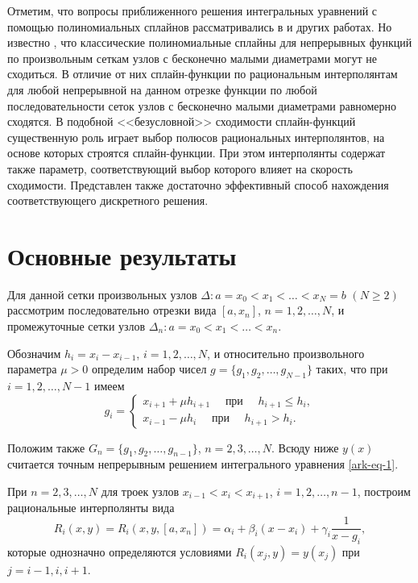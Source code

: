 Отметим, что вопросы приближенного решения интегральных уравнений с помощью полиномиальных
сплайнов рассматривались в \cite{ark-4,ark-5,ark-6,ark-7} и других работах. Но известно
\cite{ark-7, ark-8}, что классические полиномиальные сплайны для непрерывных функций
по произвольным сеткам узлов с бесконечно малыми диаметрами могут не сходиться.
В отличие от них сплайн-функции по рациональным интерполянтам \cite{ark-9} для любой непрерывной
на данном отрезке функции по любой последовательности сеток узлов с бесконечно малыми диаметрами
равномерно сходятся. В подобной <<безусловной>> сходимости сплайн-функций существенную роль
играет выбор полюсов рациональных интерполянтов, на основе которых строятся сплайн-функции.
При этом интерполянты содержат также параметр, соответствующий выбор которого
влияет на скорость сходимости. Представлен также достаточно эффективный способ нахождения
соответствующего дискретного решения.


\section{Основные результаты}
Для данной сетки произвольных узлов $\Delta: a=x_0<x_1<\dots <x_N=b$ $(N\geqslant 2)$
рассмотрим последовательно отрезки вида $[a,x_n]$, $n=1,2,\dots,N$, и промежуточные
сетки узлов $\Delta_n: a=x_0<x_1<\dots<x_n$.

Обозначим $h_i=x_i-x_{i-1}$, $i=1,2,\dots,N$, и относительно произвольного параметра
$\mu>0$ определим набор чисел $g=\{g_1,g_2,\dots,g_{N-1}\}$ таких, что при $i=1,2,\dots,N-1$
имеем
\begin{equation}\label{ark-eq-1.1}
g_i=\begin{cases}
x_{i+1}+\mu h_{i+1} \quad\text{ при }\quad h_{i+1}\leqslant h_i,\\
x_{i-1}-\mu h_i \quad \text{ при }\quad h_{i+1}> h_i.
\end{cases}
\end{equation}

Положим также $G_n=\{g_1,g_2,\dots,g_{n-1}\}$, $n=2,3,\dots,N$.
Всюду ниже $y(x)$ считается точным непрерывным решением интегрального уравнения \eqref{ark-eq-1}.

При $n=2,3,\dots,N$ для троек узлов $x_{i-1}<x_i<x_{i+1}$, $i=1,2,\dots,n-1$,
построим рациональные интерполянты вида
\begin{equation}\label{ark-eq-1.2}
R_i(x,y)=R_i(x,y,[a,x_n])=\alpha_i+\beta_i(x-x_i)+\gamma_i \frac 1{x-g_i},
\end{equation}
которые однозначно определяются условиями $R_i(x_j,y)=y(x_j)$ при $j=i-1,i,i+1$.

